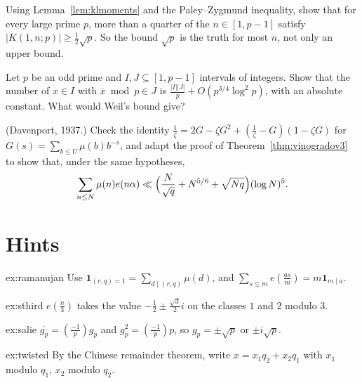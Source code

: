\begin{exercise}[$\star\star$]\label{ex:klpz}
Using Lemma~\ref{lem:klmoments} and the Paley--Zygmund inequality, show that for every large prime $p$, more than a quarter of the $n\in[1,p-1]$ satisfy $|K(1,n;p)|\ge\frac12\sqrt p$. So the bound $\sqrt p$ is the truth for most $n$, not only an upper bound.
\end{exercise}

\begin{exercise}[$\star\star$]\label{ex:inverses}
Let $p$ be an odd prime and $I,J\subseteq[1,p-1]$ intervals of integers. Show that the number of $x\in I$ with $\overline x\bmod p\in J$ is $\frac{|I||J|}p+O(p^{3/4}\log^2p)$, with an absolute constant. What would Weil's bound give?
\end{exercise}

\begin{exercise}[$\star\star\star$]\label{ex:mobiussum}
(Davenport, 1937.) Check the identity $\frac1\zeta=2G-\zeta G^2+(\frac1\zeta-G)(1-\zeta G)$ for $G(s)=\sum_{b\le U}\mu(b)b^{-s}$, and adapt the proof of Theorem~\ref{thm:vinogradov3} to show that, under the same hypotheses,
\[
\sum_{n\le N}\mu(n)e(n\alpha)\ll\Bigl(\frac N{\sqrt q}+N^{5/6}+\sqrt{Nq}\Bigr)(\log N)^5.
\]
\end{exercise}

\section{Hints}

\begin{hint}{ex:ramanujan}
Use $\mathbf 1_{(r,q)=1}=\sum_{d\mid(r,q)}\mu(d)$, and $\sum_{s\le m}e(\frac{as}m)=m\mathbf 1_{m\mid a}$.
\end{hint}

\begin{hint}{ex:sthird}
$e(\frac n3)$ takes the value $-\frac12\pm\frac{\sqrt3}2i$ on the classes $1$ and $2$ modulo $3$.
\end{hint}

\begin{hint}{ex:salie}
$\overline{g_p}=(\frac{-1}p)g_p$ and $g_p^2=(\frac{-1}p)p$, so $g_p=\pm\sqrt p$ or $\pm i\sqrt p$.
\end{hint}

\begin{hint}{ex:twisted}
By the Chinese remainder theorem, write $x=x_1q_2+x_2q_1$ with $x_1$ modulo $q_1$, $x_2$ modulo $q_2$.
\end{hint}


